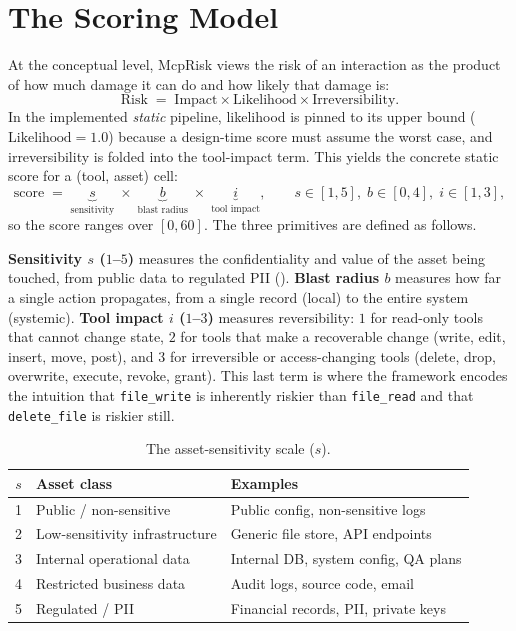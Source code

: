 \section{The Scoring Model}
\label{sec:framework:model}

At the conceptual level, McpRisk views the risk of an interaction as the
product of how much damage it can do and how likely that damage is:
\begin{equation}
\text{Risk} \;=\; \text{Impact} \times \text{Likelihood} \times
\text{Irreversibility}.
\label{eq:conceptual}
\end{equation}
In the implemented \emph{static} pipeline, likelihood is pinned to its upper
bound ($\text{Likelihood}=1.0$) because a design-time score must assume the
worst case, and irreversibility is folded into the tool-impact term. This
yields the concrete static score for a (tool, asset) cell:
\begin{equation}
\text{score} \;=\; \underbrace{s}_{\text{sensitivity}} \;\times\;
\underbrace{b}_{\text{blast radius}} \;\times\;
\underbrace{i}_{\text{tool impact}},
\qquad s \in [1,5],\; b \in [0,4],\; i \in [1,3],
\label{eq:static}
\end{equation}
so the score ranges over $[0, 60]$. The three primitives are defined as
follows.

\textbf{Sensitivity $s$ ($1$--$5$)} measures the confidentiality and value of
the asset being touched, from public data to regulated PII
(). \textbf{Blast radius $b$} measures how far a single
action propagates, from a single record (local) to the entire system
(systemic). \textbf{Tool impact $i$ ($1$--$3$)} measures reversibility: $1$ for
read-only tools that cannot change state, $2$ for tools that make a recoverable
change (write, edit, insert, move, post), and $3$ for irreversible or
access-changing tools (delete, drop, overwrite, execute, revoke, grant). This
last term is where the framework encodes the intuition that
\texttt{file\_write} is inherently riskier than \texttt{file\_read} and that
\texttt{delete\_file} is riskier still.

\begin{table}[H]
    \centering
    \caption{The asset-sensitivity scale ($s$).}
    \label{tab:sensitivity}
    \begin{tabular}{c l l}
        \hline
        \textbf{$s$} & \textbf{Asset class} & \textbf{Examples} \\
        \hline
        1 & Public / non-sensitive        & Public config, non-sensitive logs \\
        2 & Low-sensitivity infrastructure & Generic file store, API endpoints \\
        3 & Internal operational data     & Internal DB, system config, QA plans \\
        4 & Restricted business data      & Audit logs, source code, email \\
        5 & Regulated / PII               & Financial records, PII, private keys \\
        \hline
    \end{tabular}
\end{table}


